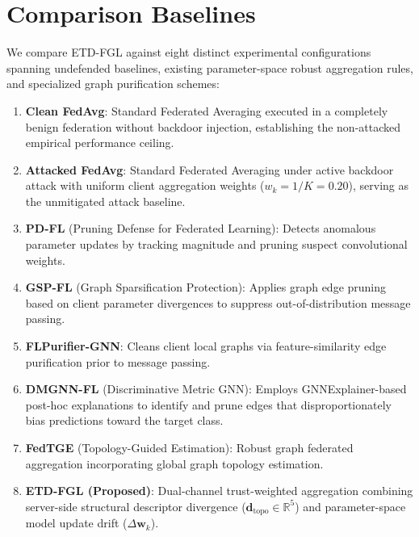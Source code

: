 \section{Comparison Baselines}
\label{sec:baselines}
We compare \textsc{ETD-FGL} against eight distinct experimental configurations spanning undefended baselines, existing parameter-space robust aggregation rules, and specialized graph purification schemes:
\begin{enumerate}
    \item \textbf{Clean FedAvg}: Standard Federated Averaging executed in a completely benign federation without backdoor injection, establishing the non-attacked empirical performance ceiling.
    \item \textbf{Attacked FedAvg}: Standard Federated Averaging under active backdoor attack with uniform client aggregation weights ($w_k = 1/K = 0.20$), serving as the unmitigated attack baseline.
    \item \textbf{PD-FL} (Pruning Defense for Federated Learning): Detects anomalous parameter updates by tracking magnitude and pruning suspect convolutional weights.
    \item \textbf{GSP-FL} (Graph Sparsification Protection): Applies graph edge pruning based on client parameter divergences to suppress out-of-distribution message passing.
    \item \textbf{FLPurifier-GNN}: Cleans client local graphs via feature-similarity edge purification prior to message passing.
    \item \textbf{DMGNN-FL} (Discriminative Metric GNN): Employs GNNExplainer-based post-hoc explanations to identify and prune edges that disproportionately bias predictions toward the target class.
    \item \textbf{FedTGE} (Topology-Guided Estimation): Robust graph federated aggregation incorporating global graph topology estimation.
    \item \textbf{\textsc{ETD-FGL} (Proposed)}: Dual-channel trust-weighted aggregation combining server-side structural descriptor divergence ($\mathbf{d}_{\text{topo}} \in \mathbb{R}^5$) and parameter-space model update drift ($\Delta \mathbf{w}_k$).
\end{enumerate}
